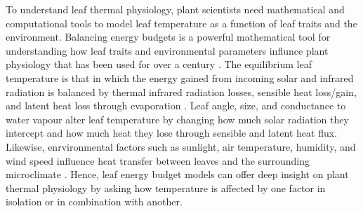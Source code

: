\documentclass[11pt, oneside]{article}
\begin{document}
To understand leaf thermal physiology, plant scientists need mathematical and computational tools to model leaf temperature as a function of leaf traits and the environment. Balancing energy budgets is a powerful mathematical tool for understanding how leaf traits and environmental parameters influnce plant physiology that has been used for over a century \citep{Raschke_1960}. The equilibrium leaf temperature is that in which the energy gained from incoming solar and infrared radiation is balanced by thermal infrared radiation losses, sensible heat loss/gain, and latent heat loss through evaporation \citep{Gutschick_2016}. Leaf angle, size, and conductance to water vapour alter leaf temperature by changing how much solar radiation they intercept and how much heat they lose through sensible and latent heat flux. Likewise, enrvironmental factors such as sunlight, air temperature, humidity, and wind speed influence heat transfer between leaves and the surrounding microclimate \citep{Gutschick_2016}. Hence, leaf energy budget models can offer deep insight on plant thermal physiology by asking how temperature is affected by one factor in isolation or in combination with another.
\end{document}
